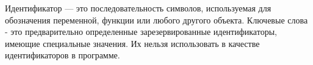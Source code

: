 Идентификатор --- это последовательность символов, используемая для
обозначения переменной, функции или любого другого объекта. Ключевые
слова - это предварительно определенные зарезервированные
идентификаторы, имеющие специальные значения. Их нельзя использовать в
качестве идентификаторов в программе.
